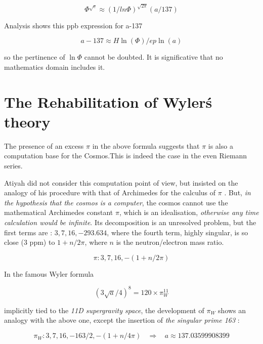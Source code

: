 \documentclass[a4paper,9pt]{article}
\begin{document}
\begin{equation}
    \Phi^{\sqrt e} \approx (1/ln\Phi)^{\sqrt {2\pi}} (a/137)
\end{equation}

Analysis shows this ppb expression for a-137

\begin{equation}
   a - 137 \approx H \ln(\Phi) /ep\ln(a)
\end{equation}

so the pertinence of $\ln\Phi$ cannot be doubted. It is significative that no mathematics domain includes it.







\section{The Rehabilitation of Wyler\'s theory}
The presence of an excess $\pi$ in the above formula suggests that $\pi$ is also a computation base for the Cosmos.This is indeed the case in the even Riemann series.


Atiyah did not consider this computation point of view, but insisted on the analogy of his procedure with that of Archimedes for the calculus of $\pi$ \cite{Atiyah}. But, \textit {in the hypothesis that the cosmos is a computer}, the cosmos cannot use the mathematical Archimedes constant $\pi$, which is an idealisation, \textit {otherwise any time calculation would be infinite}. Its decomposition is an unresolved problem, but the first terms are : $3, 7, 16, -293.634$, where the fourth term, highly singular, is so close (3 ppm) to $1 + n/2\pi$, where $n$ is the neutron/electron mass ratio.

\begin{equation}
\pi : 3, 7, 16, -(1+n/2\pi)
\end{equation}


In the famous Wyler formula \cite{Wyler} 

\begin{equation}
(3\sqrt a/4)^8 = 120 \times \pi_W^{11}
\end{equation}


implicitly tied to the \emph{11D supergravity space}, the development of  $\pi_W$ shows an analogy with the above one, except the insertion of \textit {the singular prime 163} :

\begin{equation}
\pi_W : 3, 7, 16,- 163/2, -(1+n/4\pi) ~~~~\Rightarrow ~~~~    a \approx 137.03599908399
\end{equation}
\end{document}
